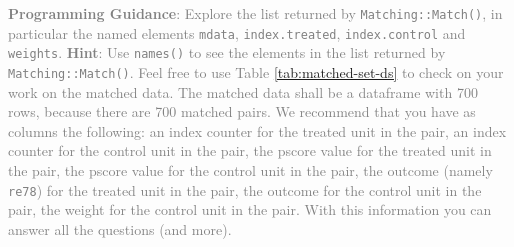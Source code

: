 \documentclass[
]{article}
\begin{document}
\textcolor{gray}{\textbf{Programming Guidance}: Explore the list returned by \texttt{Matching::Match()}, in particular the named elements \texttt{mdata}, \texttt{index.treated}, \texttt{index.control} and \texttt{weights}.}
\textcolor{gray}{\textbf{Hint}: Use \texttt{names()} to see the elements in the list returned by \texttt{Matching::Match()}. Feel free to use Table \ref{tab:matched-set-ds} to check on your work on the matched data. The matched data shall be a dataframe with 700 rows, because there are 700 matched pairs. We recommend that you have as columns the following: an index counter for the treated unit in the pair, an index counter for the control unit in the pair, the pscore value for the treated unit in the pair, the pscore value for the control unit in the pair, the outcome (namely \texttt{re78}) for the treated unit in the pair, the outcome for the control unit in the pair, the weight for the control unit in the pair. With this information you can answer all the questions (and more).}
\end{document}
